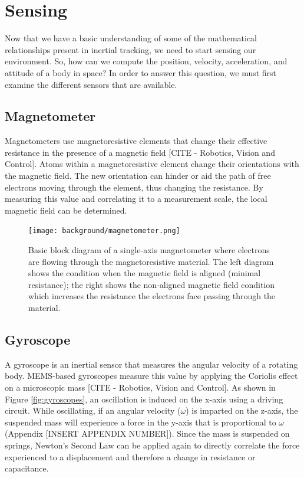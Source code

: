 \section{Sensing} \label{sec:sensing}
Now that we have a basic understanding of some of the mathematical relationships present in inertial tracking, we need to start sensing our environment.
So, how can we compute the position, velocity, acceleration, and attitude of a body in space?
In order to answer this question, we must first examine the different sensors that are available.

\subsection{Magnetometer} \label{ssec:magnetometer}
Magnetometers use magnetoresistive elements that change their effective resistance in the presence of a magnetic field [CITE - Robotics, Vision and Control].
Atoms within a magnetoresistive element change their orientations with the magnetic field.
The new orientation can hinder or aid the path of free electrons moving through the element, thus changing the resistance.
By measuring this value and correlating it to a measurement scale, the local magnetic field can be determined.

\begin{figure}[h!]
    \caption[Magnetometer block diagram]{Basic block diagram of a single-axis magnetometer where electrons are flowing through the magnetoresistive material. The left diagram shows the condition when the magnetic field is aligned (minimal resistance); the right shows the non-aligned magnetic field condition which increases the resistance the electrons face passing through the material.}
    \label{fig:magnetometer}
    \centering
    \texttt{[image: background/magnetometer.png]}
\end{figure}

\subsection{Gyroscope} \label{ssec:gyroscope}
A gyroscope is an inertial sensor that measures the angular velocity of a rotating body.
MEMS-based gyroscopes measure this value by applying the Coriolis effect on a microscopic mass [CITE - Robotics, Vision and Control].
As shown in Figure \ref{fig:gyroscopes}, an oscillation is induced on the x-axis using a driving circuit.
While oscillating, if an angular velocity ($\omega$) is imparted on the z-axis, the suspended mass will experience a force in the y-axis that is proportional to $\omega$ (Appendix [INSERT APPENDIX NUMBER]).
Since the mass is suspended on springs, Newton's Second Law can be applied again to directly correlate the force experienced to a displacement and therefore a change in resistance or capacitance.


